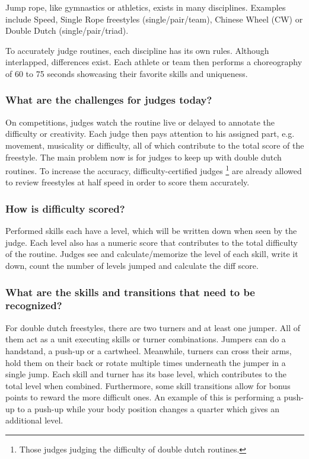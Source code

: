 Jump rope, like gymnastics or athletics, exists in many disciplines. Examples include Speed, Single Rope freestyles (single/pair/team), Chinese Wheel (CW) or Double Dutch (single/pair/triad).

To accurately judge routines, each discipline has its own rules. Although interlapped, differences exist. Each athlete or team then performs a choreography of 60 to 75 seconds showcasing their favorite skills and uniqueness.

\subsubsection{What are the challenges for judges today?}
\label{subsubsec:intro-bp-question-challenges-for-judges}

On competitions, judges watch the routine live or delayed to annotate the difficulty or creativity. Each judge then pays attention to his assigned part, e.g. movement, musicality or difficulty, all of which contribute to the total score of the freestyle. The main problem now is for judges to keep up with double dutch routines. To increase the accuracy, difficulty-certified judges \footnote{Those judges judging the difficulty of double dutch routines.} are already allowed to review freestyles at half speed in order to score them accurately.

\subsubsection{How is difficulty scored?}
\label{subsubsec:intro-bp-question-difficulty-scored}

Performed skills each have a level, which will be written down when seen by the judge. Each level also has a numeric score that contributes to the total difficulty of the routine. Judges see and calculate/memorize the level of each skill, write it down, count the number of levels jumped and calculate the diff score.

\subsubsection{What are the skills and transitions that need to be recognized?}
\label{subsubsec:intro-bp-question-what-are-the-skill}

For double dutch freestyles, there are two turners and at least one jumper. All of them act as a unit executing skills or turner combinations. Jumpers can do a handstand, a push-up or a cartwheel. Meanwhile, turners can cross their arms, hold them on their back or rotate multiple times underneath the jumper in a single jump. Each skill and turner has its base level, which contributes to the total level when combined. Furthermore, some skill transitions allow for bonus points to reward the more difficult ones. An example of this is performing a push-up to a push-up while your body position changes a quarter which gives an additional level.


